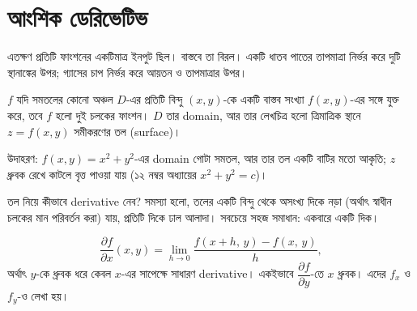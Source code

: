 \documentclass[11pt]{article}
\begin{document}
\section{আংশিক ডেরিভেটিভ}

এতক্ষণ প্রতিটি ফাংশনের একটিমাত্র ইনপুট ছিল। বাস্তবে তা বিরল। একটি ধাতব পাতের
তাপমাত্রা নির্ভর করে দুটি স্থানাঙ্কের উপর; গ্যাসের চাপ নির্ভর করে আয়তন ও
তাপমাত্রার উপর।

\begin{idea}[দুই চলকের ফাংশন]
$f$ যদি সমতলের কোনো অঞ্চল $D$-এর প্রতিটি বিন্দু $(x,y)$-কে একটি বাস্তব সংখ্যা
$f(x,y)$-এর সঙ্গে যুক্ত করে, তবে $f$ হলো দুই চলকের ফাংশন। $D$ তার domain, আর
তার লেখচিত্র হলো ত্রিমাত্রিক স্থানে $z = f(x,y)$ সমীকরণের তল (surface)।
\end{idea}

উদাহরণ: $f(x,y) = x^{2}+y^{2}$-এর domain গোটা সমতল, আর তার তল একটি বাটির মতো
আকৃতি; $z$ ধ্রুবক রেখে কাটলে বৃত্ত পাওয়া যায় (১২ নম্বর অধ্যায়ের
$x^{2}+y^{2} = c$)।

তল নিয়ে কীভাবে derivative নেব? সমস্যা হলো, তলের একটি বিন্দু থেকে অসংখ্য দিকে নড়া (অর্থাৎ স্বাধীন চলকের মান পরিবর্তন করা)
যায়, প্রতিটি দিকে ঢাল আলাদা। সবচেয়ে সহজ সমাধান: একবারে একটি দিক।

\begin{idea}[আংশিক derivative]
\[
  \frac{\partial f}{\partial x}(x,y)
  = \lim_{h \to 0} \frac{f(x+h,\, y) - f(x,\, y)}{h} ,
\]
অর্থাৎ $y$-কে ধ্রুবক ধরে কেবল $x$-এর সাপেক্ষে সাধারণ derivative। একইভাবে
$\dfrac{\partial f}{\partial y}$-তে $x$ ধ্রুবক। এদের $f_{x}$ ও $f_{y}$-ও লেখা হয়।
\end{idea}

\begin{center}
\end{center}
\end{document}

